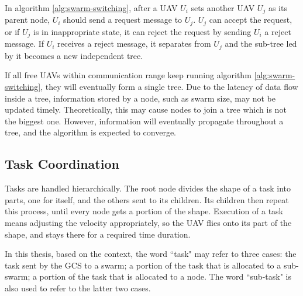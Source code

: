 In algorithm \ref{alg:swarm-switching},
after a UAV $U_i$ sets another UAV $U_j$ as its parent node,
$U_i$ should send a request message to $U_j$.
$U_j$ can accept the request,
or if $U_j$ is in inappropriate state,
it can reject the request by sending $U_i$ a reject message.
If $U_i$ receives a reject message,
it separates from $U_j$ and the sub-tree led by it becomes a new independent tree.

If all free UAVs within communication range keep running algorithm \ref{alg:swarm-switching},
they will eventually form a single tree.
Due to the latency of data flow inside a tree,
information stored by a node, such as swarm size, may not be updated timely.
Theoretically, this may cause nodes to join a tree which is not the biggest one.
However, information will eventually propagate throughout a tree,
and the algorithm is expected to converge.

\subsection{Task Coordination}

Tasks are handled hierarchically.
The root node divides the shape of a task into parts,
one for itself, and the others sent to its children.
Its children then repeat this process, until every node gets a portion of the shape.
Execution of a task means adjusting the velocity appropriately,
so the UAV flies onto its part of the shape, and stays there for a required time duration.

In this thesis, based on the context, the word ``task" may refer to three cases:
the task sent by the GCS to a swarm;
a portion of the task that is allocated to a sub-swarm;
a portion of the task that is allocated to a node.
The word ``sub-task" is also used to refer to the latter two cases.

